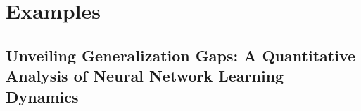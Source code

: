 \documentclass{article} %
\begin{document}
%


%
\section{Examples}
\label{app:example}
\subsection{Unveiling Generalization Gaps: A Quantitative Analysis of Neural Network Learning Dynamics}



%

%
%

%
\end{document}
